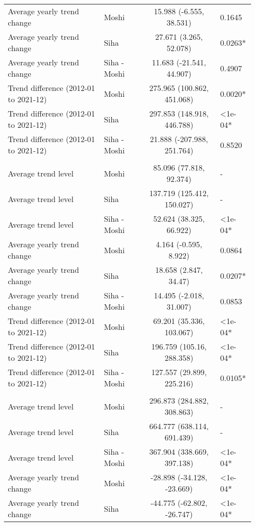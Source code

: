 \begin{longtable}{l|lcl}
Average yearly trend change & Moshi & 15.988 (-6.555, 38.531) & 0.1645 \\ 
Average yearly trend change & Siha & 27.671 (3.265, 52.078) & 0.0263* \\ 
Average yearly trend change & Siha - Moshi & 11.683 (-21.541, 44.907) & 0.4907 \\ 
Trend difference (2012-01 to 2021-12) & Moshi & 275.965 (100.862, 451.068) & 0.0020* \\ 
Trend difference (2012-01 to 2021-12) & Siha & 297.853 (148.918, 446.788) & <1e-04* \\ 
Trend difference (2012-01 to 2021-12) & Siha - Moshi & 21.888 (-207.988, 251.764) & 0.8520 \\ 
\midrule\addlinespace[2.5pt]
\multicolumn{4}{l}{Infectious Eye Disease} \\[2.5pt] 
\midrule\addlinespace[2.5pt]
Average trend level & Moshi & 85.096 (77.818, 92.374) & - \\ 
Average trend level & Siha & 137.719 (125.412, 150.027) & - \\ 
Average trend level & Siha - Moshi & 52.624 (38.325, 66.922) & <1e-04* \\ 
Average yearly trend change & Moshi & 4.164 (-0.595, 8.922) & 0.0864 \\ 
Average yearly trend change & Siha & 18.658 (2.847, 34.47) & 0.0207* \\ 
Average yearly trend change & Siha - Moshi & 14.495 (-2.018, 31.007) & 0.0853 \\ 
Trend difference (2012-01 to 2021-12) & Moshi & 69.201 (35.336, 103.067) & <1e-04* \\ 
Trend difference (2012-01 to 2021-12) & Siha & 196.759 (105.16, 288.358) & <1e-04* \\ 
Trend difference (2012-01 to 2021-12) & Siha - Moshi & 127.557 (29.899, 225.216) & 0.0105* \\ 
\midrule\addlinespace[2.5pt]
\multicolumn{4}{l}{Intestinal Worms} \\[2.5pt] 
\midrule\addlinespace[2.5pt]
Average trend level & Moshi & 296.873 (284.882, 308.863) & - \\ 
Average trend level & Siha & 664.777 (638.114, 691.439) & - \\ 
Average trend level & Siha - Moshi & 367.904 (338.669, 397.138) & <1e-04* \\ 
Average yearly trend change & Moshi & -28.898 (-34.128, -23.669) & <1e-04* \\ 
Average yearly trend change & Siha & -44.775 (-62.802, -26.747) & <1e-04* \\ 

\end{longtable}
